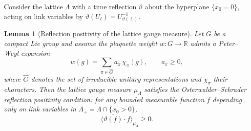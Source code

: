 \documentclass[12pt,a4paper]{article}
\theoremstyle{definition}
\theoremstyle{plain}
\newtheorem{lemma}[definition]{Lemma}
\theoremstyle{remark}
\begin{document}
Consider the lattice $\Lambda$ with a time reflection $\vartheta$ about the hyperplane $\{x_0 = 0\}$, acting on link variables by $\vartheta(U_\ell) = U_{\vartheta(\ell)}^{-1}$.

\begin{lemma}[Reflection positivity of the lattice gauge measure]
\label{lem:reflection-positivity}
Let $G$ be a compact Lie group and assume the plaquette weight $w: G \to \mathbb{R}$ admits a Peter--Weyl expansion
\begin{equation}\label{eq:PW-coefficients}
    w(g) = \sum_{\pi \in \widehat{G}} a_\pi\,\chi_\pi(g), \qquad a_\pi \geq 0,
\end{equation}
where $\widehat{G}$ denotes the set of irreducible unitary representations and $\chi_\pi$ their characters.  Then the lattice gauge measure $\mu_\Lambda$ satisfies the Osterwalder--Schrader reflection positivity condition: for any bounded measurable function $f$ depending only on link variables in $\Lambda_+ = \Lambda \cap \{x_0 > 0\}$,
\begin{equation}
    \langle \overline{\vartheta(f)} \cdot f \rangle_{\mu_\Lambda} \geq 0.
\end{equation}
\end{lemma}
\end{document}
